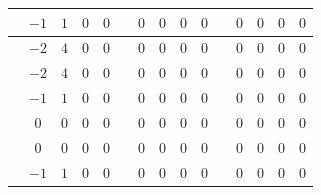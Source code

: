\begin{table}[H]
\begin{tabular}{|c|c|c|c|c|c|c|c|c|c|c|c|c|c|c|}
\hline
\cellcolor{destacado}{\bfseries\boldmath $6$} & \cellcolor{destacado}$-1$ & \cellcolor{destacado}$1$ & \cellcolor{destacado}$0$ & \cellcolor{destacado}$0$ & \cellcolor{iteracion}{\bfseries\boldmath $40$} & $0$ & $0$ & $0$ & $0$ & \cellcolor{iteracion}{\bfseries\boldmath $74$} & $0$ & $0$ & $0$ & $0$ \\
\hline
\cellcolor{destacado}{\bfseries\boldmath $7$} & \cellcolor{destacado}$-2$ & \cellcolor{destacado}$4$ & \cellcolor{destacado}$0$ & \cellcolor{destacado}$0$ & \cellcolor{iteracion}{\bfseries\boldmath $41$} & \cellcolor{cebra}$0$ & \cellcolor{cebra}$0$ & \cellcolor{cebra}$0$ & \cellcolor{cebra}$0$ & \cellcolor{iteracion}{\bfseries\boldmath $75$} & \cellcolor{cebra}$0$ & \cellcolor{cebra}$0$ & \cellcolor{cebra}$0$ & \cellcolor{cebra}$0$ \\
\hline
\cellcolor{iteracion}{\bfseries\boldmath $8$} & $-2$ & $4$ & $0$ & $0$ & \cellcolor{iteracion}{\bfseries\boldmath $42$} & $0$ & $0$ & $0$ & $0$ & \cellcolor{iteracion}{\bfseries\boldmath $76$} & $0$ & $0$ & $0$ & $0$ \\
\hline
\cellcolor{iteracion}{\bfseries\boldmath $9$} & \cellcolor{cebra}$-1$ & \cellcolor{cebra}$1$ & \cellcolor{cebra}$0$ & \cellcolor{cebra}$0$ & \cellcolor{iteracion}{\bfseries\boldmath $43$} & \cellcolor{cebra}$0$ & \cellcolor{cebra}$0$ & \cellcolor{cebra}$0$ & \cellcolor{cebra}$0$ & \cellcolor{iteracion}{\bfseries\boldmath $77$} & \cellcolor{cebra}$0$ & \cellcolor{cebra}$0$ & \cellcolor{cebra}$0$ & \cellcolor{cebra}$0$ \\
\hline
\cellcolor{iteracion}{\bfseries\boldmath $10$} & $0$ & $0$ & $0$ & $0$ & \cellcolor{iteracion}{\bfseries\boldmath $44$} & $0$ & $0$ & $0$ & $0$ & \cellcolor{iteracion}{\bfseries\boldmath $78$} & $0$ & $0$ & $0$ & $0$ \\
\hline
\cellcolor{iteracion}{\bfseries\boldmath $11$} & \cellcolor{cebra}$0$ & \cellcolor{cebra}$0$ & \cellcolor{cebra}$0$ & \cellcolor{cebra}$0$ & \cellcolor{iteracion}{\bfseries\boldmath $45$} & \cellcolor{cebra}$0$ & \cellcolor{cebra}$0$ & \cellcolor{cebra}$0$ & \cellcolor{cebra}$0$ & \cellcolor{iteracion}{\bfseries\boldmath $79$} & \cellcolor{cebra}$0$ & \cellcolor{cebra}$0$ & \cellcolor{cebra}$0$ & \cellcolor{cebra}$0$ \\
\hline
\cellcolor{destacado}{\bfseries\boldmath $12$} & \cellcolor{destacado}$-1$ & \cellcolor{destacado}$1$ & \cellcolor{destacado}$0$ & \cellcolor{destacado}$0$ & \cellcolor{iteracion}{\bfseries\boldmath $46$} & $0$ & $0$ & $0$ & $0$ & \cellcolor{iteracion}{\bfseries\boldmath $80$} & $0$ & $0$ & $0$ & $0$ \\

\end{tabular}
\end{table}
